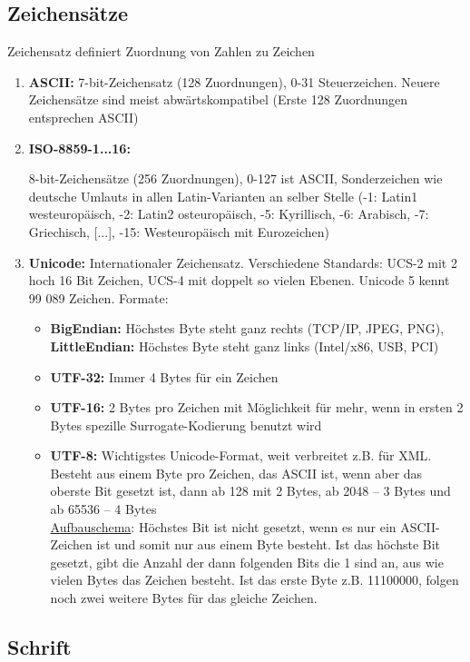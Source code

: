 \documentclass[12pt,landscape]{article}
\begin{document}
\begin{multicols}{3}
\subsection{Zeichensätze}
Zeichensatz definiert Zuordnung von Zahlen zu Zeichen
\begin{enumerate}
\item \textbf{ASCII:} 7-bit-Zeichensatz (128 Zuordnungen), 0-31 Steuerzeichen. Neuere Zeichensätze sind meist abwärtskompatibel (Erste 128 Zuordnungen entsprechen ASCII)
\item \hypertarget{latin}{\textbf{ISO-8859-1...16:}} 8-bit-Zeichensätze (256 Zuordnungen), 0-127 ist ASCII, Sonderzeichen wie deutsche Umlauts in allen Latin-Varianten an selber Stelle (-1: Latin1 westeuropäisch, -2: Latin2 osteuropäisch, -5: Kyrillisch, -6: Arabisch, -7: Griechisch, [...], -15: Westeuropäisch mit Eurozeichen)
\item \textbf{Unicode:} Internationaler Zeichensatz. Verschiedene Standards: UCS-2 mit 2 hoch 16 Bit Zeichen, UCS-4 mit doppelt so vielen Ebenen. Unicode 5 kennt 99 089 Zeichen. Formate:
\begin{itemize}
\item \textbf{BigEndian:} Höchstes Byte steht ganz rechts (TCP/IP, JPEG, PNG),\\
\textbf{LittleEndian:} Höchstes Byte steht ganz links (Intel/x86, USB, PCI)
\item \textbf{UTF-32:} Immer 4 Bytes für ein Zeichen
\item \textbf{UTF-16:} 2 Bytes pro Zeichen mit Möglichkeit für mehr, wenn in ersten 2 Bytes spezille Surrogate-Kodierung benutzt wird
\item \textbf{UTF-8:} Wichtigstes Unicode-Format, weit verbreitet z.B. für XML. Besteht aus einem Byte pro Zeichen, das ASCII ist, wenn aber das oberste Bit gesetzt ist, dann ab 128 mit 2 Bytes, ab 2048 -- 3 Bytes und ab 65536 -- 4 Bytes\\ \underline{Aufbauschema}: Höchstes Bit ist nicht gesetzt, wenn es nur ein ASCII-Zeichen ist und somit nur aus einem Byte besteht. Ist das höchste Bit gesetzt, gibt die Anzahl der dann folgenden Bits die 1 sind an, aus wie vielen Bytes das Zeichen besteht. Ist das erste Byte z.B. 11100000, folgen noch zwei weitere Bytes für das gleiche Zeichen. 
\end{itemize}
\end{enumerate}
\subsection{Schrift}

\end{multicols}
\end{document}
